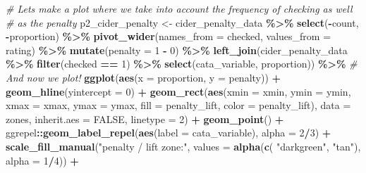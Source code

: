 \documentclass[
]{book}
\newenvironment{Shaded}{\begin{snugshade}}{\end{snugshade}}
\newcommand{\AttributeTok}[1]{\textcolor[rgb]{0.13,0.29,0.53}{#1}}
\newcommand{\CommentTok}[1]{\textcolor[rgb]{0.56,0.35,0.01}{\textit{#1}}}
\newcommand{\ConstantTok}[1]{\textcolor[rgb]{0.56,0.35,0.01}{#1}}
\newcommand{\DecValTok}[1]{\textcolor[rgb]{0.00,0.00,0.81}{#1}}
\newcommand{\FunctionTok}[1]{\textcolor[rgb]{0.13,0.29,0.53}{\textbf{#1}}}
\newcommand{\NormalTok}[1]{#1}
\newcommand{\OtherTok}[1]{\textcolor[rgb]{0.56,0.35,0.01}{#1}}
\newcommand{\SpecialCharTok}[1]{\textcolor[rgb]{0.81,0.36,0.00}{\textbf{#1}}}
\newcommand{\StringTok}[1]{\textcolor[rgb]{0.31,0.60,0.02}{#1}}
\begin{document}
\begin{Shaded}
\begin{Highlighting}[]
\CommentTok{\# Let\textquotesingle{}s make a plot where we take into account the frequency of checking as well}
\CommentTok{\# as the penalty}
\NormalTok{p2\_cider\_penalty }\OtherTok{\textless{}{-}} 
\NormalTok{  cider\_penalty\_data }\SpecialCharTok{\%\textgreater{}\%}
  \FunctionTok{select}\NormalTok{(}\SpecialCharTok{{-}}\NormalTok{count, }\SpecialCharTok{{-}}\NormalTok{proportion) }\SpecialCharTok{\%\textgreater{}\%}
  \FunctionTok{pivot\_wider}\NormalTok{(}\AttributeTok{names\_from =}\NormalTok{ checked,}
              \AttributeTok{values\_from =}\NormalTok{ rating) }\SpecialCharTok{\%\textgreater{}\%}
  \FunctionTok{mutate}\NormalTok{(}\AttributeTok{penalty =} \StringTok{\textasciigrave{}}\AttributeTok{1}\StringTok{\textasciigrave{}} \SpecialCharTok{{-}} \StringTok{\textasciigrave{}}\AttributeTok{0}\StringTok{\textasciigrave{}}\NormalTok{) }\SpecialCharTok{\%\textgreater{}\%}
  \FunctionTok{left\_join}\NormalTok{(cider\_penalty\_data }\SpecialCharTok{\%\textgreater{}\%}
              \FunctionTok{filter}\NormalTok{(checked }\SpecialCharTok{==} \DecValTok{1}\NormalTok{) }\SpecialCharTok{\%\textgreater{}\%}
              \FunctionTok{select}\NormalTok{(cata\_variable, proportion)) }\SpecialCharTok{\%\textgreater{}\%}
  \CommentTok{\# And now we plot!}
  \FunctionTok{ggplot}\NormalTok{(}\FunctionTok{aes}\NormalTok{(}\AttributeTok{x =}\NormalTok{ proportion, }\AttributeTok{y =}\NormalTok{ penalty)) }\SpecialCharTok{+} 
  \FunctionTok{geom\_hline}\NormalTok{(}\AttributeTok{yintercept =} \DecValTok{0}\NormalTok{) }\SpecialCharTok{+} 
  \FunctionTok{geom\_rect}\NormalTok{(}\FunctionTok{aes}\NormalTok{(}\AttributeTok{xmin =}\NormalTok{ xmin, }\AttributeTok{ymin =}\NormalTok{ ymin, }
                \AttributeTok{xmax =}\NormalTok{ xmax, }\AttributeTok{ymax =}\NormalTok{ ymax,}
                \AttributeTok{fill =}\NormalTok{ penalty\_lift, }\AttributeTok{color =}\NormalTok{ penalty\_lift),}
            \AttributeTok{data =}\NormalTok{ zones, }
            \AttributeTok{inherit.aes =} \ConstantTok{FALSE}\NormalTok{,}
            \AttributeTok{linetype =} \DecValTok{2}\NormalTok{) }\SpecialCharTok{+} 
  \FunctionTok{geom\_point}\NormalTok{() }\SpecialCharTok{+} 
\NormalTok{  ggrepel}\SpecialCharTok{::}\FunctionTok{geom\_label\_repel}\NormalTok{(}\FunctionTok{aes}\NormalTok{(}\AttributeTok{label =}\NormalTok{ cata\_variable), }\AttributeTok{alpha =} \DecValTok{2}\SpecialCharTok{/}\DecValTok{3}\NormalTok{) }\SpecialCharTok{+} 
  \FunctionTok{scale\_fill\_manual}\NormalTok{(}\StringTok{"penalty / lift zone:"}\NormalTok{, }
                    \AttributeTok{values =} \FunctionTok{alpha}\NormalTok{(}\FunctionTok{c}\NormalTok{( }\StringTok{"darkgreen"}\NormalTok{, }\StringTok{"tan"}\NormalTok{), }\AttributeTok{alpha =} \DecValTok{1}\SpecialCharTok{/}\DecValTok{4}\NormalTok{)) }\SpecialCharTok{+} 

\end{Highlighting}
\end{Shaded}
\end{document}
